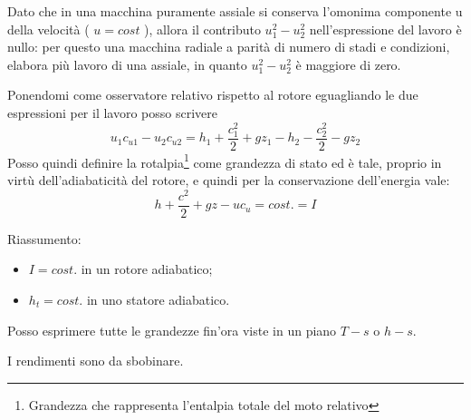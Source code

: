 Dato che in una macchina puramente assiale si conserva l'omonima componente u della velocità ( $u = cost$ ), allora il contributo $u_1^2 - u_2^2$ nell'espressione del lavoro è nullo: per questo una macchina radiale a parità di numero di stadi e condizioni, elabora più lavoro di una assiale, in quanto $u_1^2 - u_2^2$ è maggiore di zero.

Ponendomi come osservatore relativo rispetto al rotore eguagliando le due espressioni per il lavoro posso scrivere
\begin{equation}
u_1 c_{u1} - u_2 c_{u2} = h_1 + \frac{c_1^2}{2}+gz_1-h_2-\frac{c_2^2}{2}-gz_2
\end{equation}
Posso quindi definire la rotalpia\footnote{Grandezza che rappresenta l'entalpia totale del moto relativo} come grandezza di stato ed è tale, proprio in virtù dell'adiabaticità del rotore, e quindi per la conservazione dell'energia vale:
\begin{equation}
h+\frac{c^2}{2}+gz-u c_u = cost. = I
\end{equation}

Riassumento:
\begin{itemize}
\item $I=cost.$ in un rotore adiabatico;
\item $h_t=cost.$ in uno statore adiabatico.
\end{itemize}

Posso esprimere tutte le grandezze fin'ora viste in un piano $T-s$ o $h-s$.

I rendimenti sono da sbobinare.
\pagebreak